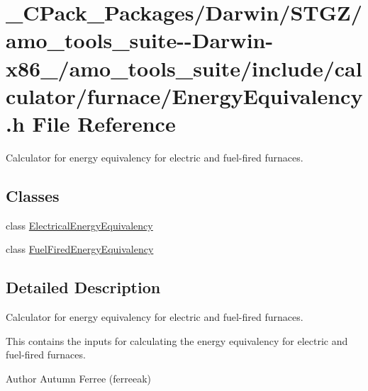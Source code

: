 \hypertarget{___c_pack___packages_2_darwin_2_s_t_g_z_2amo__tools__suite--_darwin-x86__64_2amo__tools__suite_22deb35937168994abc5651756c82123a}{}\section{\+\_\+\+C\+Pack\+\_\+\+Packages/\+Darwin/\+S\+T\+G\+Z/amo\+\_\+tools\+\_\+suite-\/-\/\+Darwin-\/x86\+\_/amo\+\_\+tools\+\_\+suite/include/calculator/furnace/\+Energy\+Equivalency.h File Reference}
\label{___c_pack___packages_2_darwin_2_s_t_g_z_2amo__tools__suite--_darwin-x86__64_2amo__tools__suite_22deb35937168994abc5651756c82123a}


Calculator for energy equivalency for electric and fuel-\/fired furnaces.  


\subsection*{Classes}
\begin{DoxyCompactItemize}
\item 
class \hyperlink{class_electrical_energy_equivalency}{Electrical\+Energy\+Equivalency}
\item 
class \hyperlink{class_fuel_fired_energy_equivalency}{Fuel\+Fired\+Energy\+Equivalency}
\end{DoxyCompactItemize}


\subsection{Detailed Description}
Calculator for energy equivalency for electric and fuel-\/fired furnaces. 

This contains the inputs for calculating the energy equivalency for electric and fuel-\/fired furnaces.

\begin{DoxyAuthor}{Author}
Autumn Ferree (ferreeak) 
\end{DoxyAuthor}
